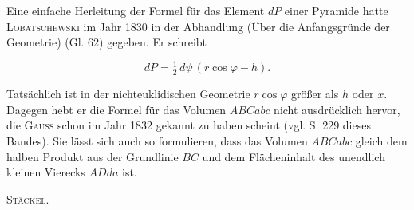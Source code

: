 Eine einfache Herleitung der Formel für das Element $dP$ einer Pyramide hatte
\textsc{Lobatschewski} im Jahr 1830 in der Abhandlung  (Über
die Anfangsgründe der Geometrie) (Gl. 62) gegeben. Er schreibt

\[
dP = \tfrac{1}{2}\, d\psi\,(r\cos\varphi - h).
\]


Tatsächlich ist in der nichteuklidischen Geometrie $r\cos\varphi$ größer als $h$
oder $x$. Dagegen hebt er die Formel für das Volumen $ABCabc$ nicht
ausdrücklich hervor, die \textsc{Gauss} schon im Jahr 1832
gekannt zu haben scheint (vgl. S. 229 dieses Bandes). Sie lässt sich auch so
formulieren, dass das Volumen $ABCabc$ gleich dem halben Produkt aus der Grundlinie
$BC$ und dem Flächeninhalt des unendlich kleinen Vierecks $ADda$ ist. \begin{flushright}\textsc{Stäckel.}\end{flushright}



\par\endgroup
